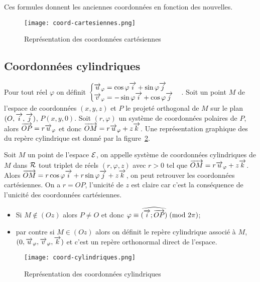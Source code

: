 \danger Ces formules donnent les \og{}anciennes\fg{} coordonnées en fonction des 
\og{}nouvelles\fg{}.

\begin{figure}
  \centering
  \texttt{[image: coord-cartesiennes.png]}
  \caption{Représentation des coordonnées cartésiennes}
  \label{fig:repcart}
\end{figure}

\subsection{Coordonnées cylindriques}
\label{subsec:coordcyl}
Pour tout réel \(\varphi\) on définit \(
\begin{cases}
  \overrightarrow{u}_\varphi = \cos\varphi\overrightarrow{i} + \sin\varphi\overrightarrow{j} \\ \overrightarrow{v}_\varphi = -\sin\varphi\overrightarrow{i} 
  + \cos\varphi\overrightarrow{j}
\end{cases}\).  Soit un point \(M\) de l'espace de coordonnées \((x, y, z)\) et 
\(P\) le projeté orthogonal de \(M\) sur le plan \((O,\overrightarrow{i},\overrightarrow{j})\), \(P(x, y, 0)\). Soit 
\((r, \varphi)\) un système de coordonnées polaires de \(P\), alors 
\(\overrightarrow{OP}=r\overrightarrow{u}_\varphi\) et donc \(\overrightarrow{OM}=r\overrightarrow{u}_\varphi + z\overrightarrow{k}\). Une 
représentation graphique des du repère cylindrique est donné par la 
figure~\ref{fig:repcyl}.

\begin{defdef}
  Soit \(M\) un point de l'espace \(\mathcal{E}\), on appelle système de coordonnées 
  cylindriques de \(M\) dans \(\mathcal{R}\) tout triplet de réels \((r, \varphi, z)\) 
  avec \(r>0\) tel que \(\overrightarrow{OM}=r\overrightarrow{u}_\varphi + z\overrightarrow{k}\). Alors 
  \(\overrightarrow{OM}=r\cos\varphi\overrightarrow{i} + r\sin\varphi\overrightarrow{j} + z\overrightarrow{k}\), on peut retrouver les 
  coordonnées cartésiennes. On a \(r = OP\), l'unicité de \(z\) est claire car 
  c'est la conséquence de l'unicité des coordonnées cartésiennes.  
  \begin{itemize}
    \item Si \(M\notin(Oz)\) alors \(P\neq O\) et donc 
      \(\varphi \equiv \widehat{(\overrightarrow{i};\overrightarrow{OP})}\!\pmod {2\pi}\);
    \item par contre si \(M\in(Oz)\) alors on définit le repère cylindrique 
      associé à \(M\), \((0, \overrightarrow{u}_\varphi, \overrightarrow{v}_\varphi, \overrightarrow{k})\) et c'est un repère 
      orthonormal direct de l'espace.
  \end{itemize}
\end{defdef}

\begin{figure}
  \centering
  \texttt{[image: coord-cylindriques.png]}
  \caption{Représentation des coordonnées cylindriques}
  \label{fig:repcyl}
\end{figure}

